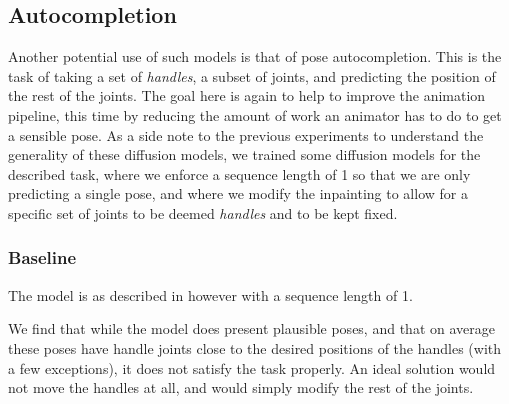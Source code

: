 

\subsection{Autocompletion}
\label{sec:autocomplete}

Another potential use of such models is that of pose autocompletion. This is the task of taking a set of \textit{handles}, a subset of joints, and predicting the position of the rest of the joints. The goal here is again to help to improve the animation pipeline, this time by reducing the amount of work an animator has to do to get a sensible pose. As a side note to the previous experiments to understand the generality of these diffusion models, we trained some diffusion models for the described task, where we enforce a sequence length of 1 so that we are only predicting a single pose, and where we modify the inpainting to allow for a specific set of joints to be deemed \textit{handles} and to be kept fixed.

\subsubsection{Baseline}
The model is as described in  however with a sequence length of 1.

We find that while the model does present plausible poses, and that on average these poses have handle joints close to the desired positions of the handles (with a few exceptions), it does not satisfy the task properly.  An ideal solution would not move the handles at all, and would simply modify the rest of the joints.



